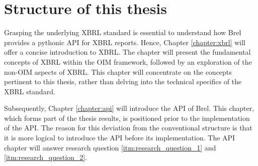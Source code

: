 \section{Structure of this thesis}

Grasping the underlying XBRL standard is essential to understand how Brel provides a pythonic API for XBRL reports.
Hence, Chapter \ref{chapter:xbrl} will offer a concise introduction to XBRL.
The chapter will present the fundamental concepts of XBRL within the OIM framework, followed by an exploration of the non-OIM aspects of XBRL.
This chapter will concentrate on the concepts pertinent to this thesis, rather than delving into the technical specifics of the XBRL standard.

Subsequently, Chapter \ref{chapter:api} will introduce the API of Brel.
This chapter, which forms part of the thesis results, is positioned prior to the implementation of the API.
The reason for this deviation from the conventional structure is that it is more logical to introduce the API before its implementation.
The API chapter will answer research question \ref{itm:research_question_1} and \ref{itm:research_question_2}.

